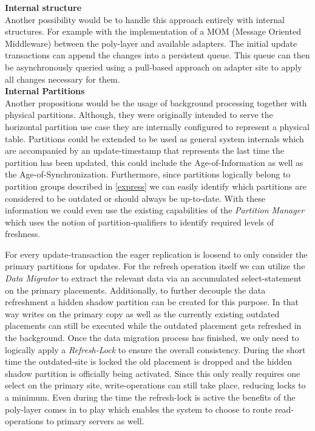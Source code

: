 \textbf{Internal structure}\\
Another possibility would be to handle this approach entirely with internal structures.
For example with the implementation of a MOM (Message Oriented Middleware) between the poly-layer and available adapters. The initial update transactions can append 
the changes into a persistent queue. This queue can then be asynchronously queried using a pull-based approach on adapter site to apply all changes necessary for them. \\

\textbf{Internal Partitions} \\
Another propositions would be the usage of background processing together with physical partitions. Although, they were originally intended to serve the horizontal partition 
use case they are internally configured to represent a physical table. Partitions could be extended to be used as general system internals
which are accompanied by an update-timestamp that represents the last time the partition has been updated, this could include the Age-of-Information as well as 
the Age-of-Synchronization. Furthermore, since partitions logically belong to partition groups described in \ref{express} we can easily identify which partitions are considered to be 
outdated or should always be up-to-date. With these information we could even use the existing capabilities of the \emph{Partition Manager} which uses the notion of 
partition-qualifiers to identify required levels of freshness.

For every update-transaction the eager replication is loosend to only consider the primary partitions for updates.
For the refresh operation itself we can utilize the \emph{Data Migrator} to extract the relevant data via an accumulated select-statement on the primary placements.
Additionally, to further decouple the data refreshment a hidden shadow partition can be created for this purpose. In that way writes on the primary copy as well as the 
currently existing outdated placements can still be executed while the outdated placement gets refreshed in the background. Once the data migration process has finished, 
we only need to logically apply a \emph{Refresh-Lock} to ensure the overall consistency. During the short time the outdated-site is locked the old placement is dropped and 
the hidden shadow partition is officially being activated. Since this only really requires one select on the primary site, write-operations can still take place, reducing
locks to a minimum. Even during the time the refresh-lock is active the benefits of the poly-layer comes in to play which enables the system to choose to 
route read-operations to primary servers as well.\\


